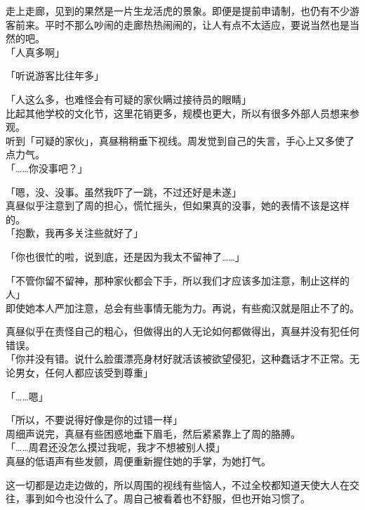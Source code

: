 走上走廊，见到的果然是一片生龙活虎的景象。即便是提前申请制，也仍有不少游客前来。平时不那么吵闹的走廊热热闹闹的，让人有点不太适应，要说当然也是当然的吧。\\

「人真多啊」

「听说游客比往年多」

「人这么多，也难怪会有可疑的家伙瞒过接待员的眼睛」\\

比起其他学校的文化节，这里花销更多，规模也更大，所以有很多外部人员想来参观。\\

听到「可疑的家伙」，真昼稍稍垂下视线。周发觉到自己的失言，手心上又多使了点力气。\\

「……你没事吧？」

「嗯，没、没事。虽然我吓了一跳，不过还好是未遂」\\

真昼似乎注意到了周的担心，慌忙摇头，但如果真的没事，她的表情不该是这样的。\\

「抱歉，我再多关注些就好了」

「你也很忙的啦，说到底，还是因为我太不留神了……」

「不管你留不留神，那种家伙都会下手，所以我们才应该多加注意，制止这样的人」\\

即使她本人严加注意，总会有些事情无能为力。再说，有些痴汉就是阻止不了的。

真昼似乎在责怪自己的粗心，但做得出的人无论如何都做得出，真昼并没有犯任何错误。\\

「你并没有错。说什么脸蛋漂亮身材好就活该被欲望侵犯，这种蠢话才不正常。无论男女，任何人都应该受到尊重」

「……嗯」

「所以，不要说得好像是你的过错一样」\\

周细声说完，真昼有些困惑地垂下眉毛，然后紧紧靠上了周的胳膊。\\

「……周君还没怎么摸过我呢，我才不想被别人摸」\\

真昼的低语声有些发颤，周便重新握住她的手掌，为她打气。

这一切都是边走边做的，所以周围的视线有些恼人，不过全校都知道天使大人在交往，事到如今也没什么了。周自己被看着也不舒服，但也开始习惯了。\\

